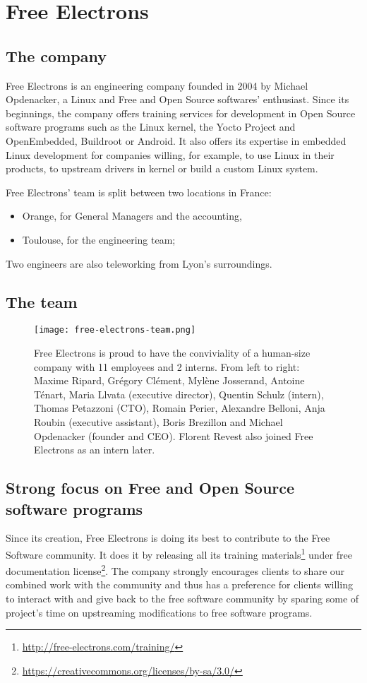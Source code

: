 \chapter{Free Electrons}

\section{The company}
Free Electrons is an engineering company founded in 2004 by Michael Opdenacker, a Linux and Free and Open Source softwares' enthusiast. Since its beginnings, the company offers training services for development in Open Source software programs such as the Linux kernel, the Yocto Project and OpenEmbedded, Buildroot or Android. It also offers its expertise in embedded Linux development for companies willing, for example, to use Linux in their products, to upstream drivers in kernel or build a custom Linux system.

Free Electrons' team is split between two locations in France:
\begin{itemize}
  \item Orange, for General Managers and the accounting,
  \item Toulouse, for the engineering team;
\end{itemize}

Two engineers are also teleworking from Lyon's surroundings.

\section{The team}

\begin{figure}[H]
  \centering
  \texttt{[image: free-electrons-team.png]}
  \caption{Free Electrons is proud to have the conviviality of a human-size company with 11 employees and 2 interns. From left to right: Maxime Ripard, Grégory Clément, Mylène Josserand, Antoine Ténart, Maria Llvata (executive director), Quentin Schulz (intern), Thomas Petazzoni (CTO), Romain Perier, Alexandre Belloni, Anja Roubin (executive assistant), Boris Brezillon and Michael Opdenacker (founder and CEO). Florent Revest also joined Free Electrons as an intern later.}
\end{figure}

\section{Strong focus on Free and Open Source software programs}
Since its creation, Free Electrons is doing its best to contribute to the Free Software community. It does it by releasing all its training materials\footnote{\url{http://free-electrons.com/training/}} under free documentation license\footnote{\url{https://creativecommons.org/licenses/by-sa/3.0/}}. The company strongly encourages clients to share our combined work with the community and thus has a preference for clients willing to interact with and give back to the free software community by sparing some of project's time on upstreaming modifications to free software programs.

